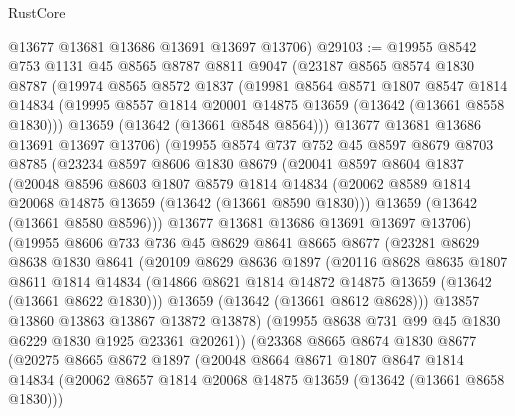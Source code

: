 \begin{lexlean}{RustCore}
\begin{coremodule}
      @13677
      @13681
      @13686
      @13691
      @13697
      @13706)
@29103 := @19955
    @8542
    @753
    @1131
    @45
    @8565
    @8787
    @8811
    @9047
    (@23187
      @8565
      @8574
      @1830
      @8787
      (@19974
        @8565
        @8572
        @1837
        (@19981
          @8564
          @8571
          @1807
          @8547
          @1814
          @14834
          (@19995 @8557 @1814 @20001 @14875 @13659 (@13642 (@13661 @8558 @1830)))
          @13659
          (@13642 (@13661 @8548 @8564)))
        @13677
        @13681
        @13686
        @13691
        @13697
        @13706)
      (@19955
        @8574
        @737
        @752
        @45
        @8597
        @8679
        @8703
        @8785
        (@23234
          @8597
          @8606
          @1830
          @8679
          (@20041
            @8597
            @8604
            @1837
            (@20048
              @8596
              @8603
              @1807
              @8579
              @1814
              @14834
              (@20062 @8589 @1814 @20068 @14875 @13659 (@13642 (@13661 @8590 @1830)))
              @13659
              (@13642 (@13661 @8580 @8596)))
            @13677
            @13681
            @13686
            @13691
            @13697
            @13706)
          (@19955
            @8606
            @733
            @736
            @45
            @8629
            @8641
            @8665
            @8677
            (@23281
              @8629
              @8638
              @1830
              @8641
              (@20109
                @8629
                @8636
                @1897
                (@20116
                  @8628
                  @8635
                  @1807
                  @8611
                  @1814
                  @14834
                  (@14866 @8621 @1814 @14872 @14875 @13659 (@13642 (@13661 @8622 @1830)))
                  @13659
                  (@13642 (@13661 @8612 @8628)))
                @13857
                @13860
                @13863
                @13867
                @13872
                @13878)
              (@19955 @8638 @731 @99 @45 @1830 @6229 @1830 @1925 @23361 @20261))
            (@23368
              @8665
              @8674
              @1830
              @8677
              (@20275
                @8665
                @8672
                @1897
                (@20048
                  @8664
                  @8671
                  @1807
                  @8647
                  @1814
                  @14834
                  (@20062 @8657 @1814 @20068 @14875 @13659 (@13642 (@13661 @8658 @1830)))

\end{coremodule}
\end{lexlean}
